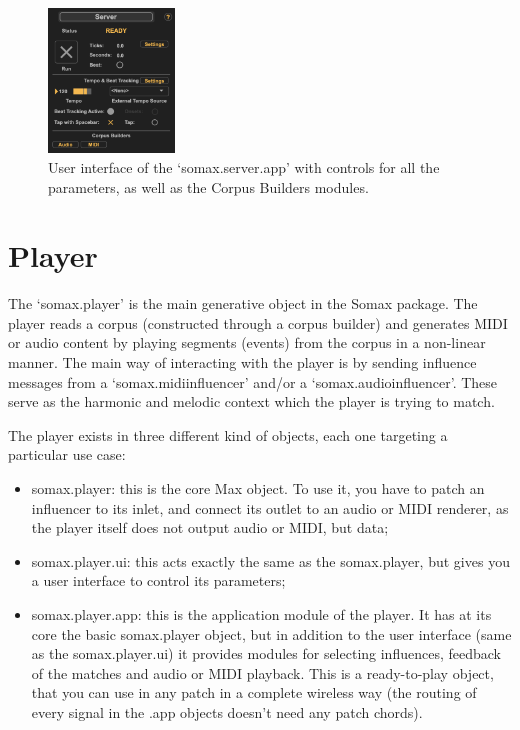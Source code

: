  \begin{figure}[H]
    \centering        
 	\includegraphics[width=0.3\textwidth, keepaspectratio]{img/server_app.png}
    \caption{User interface of the `somax.server.app' with controls for all the parameters, as well as the Corpus Builders modules.}
    \label{fig:server_app}
\end{figure}

\section{Player}

The `somax.player' is the main generative object in the Somax package. The player reads a corpus (constructed through a corpus builder) and generates MIDI or audio content by playing segments (events) from the corpus in a non-linear manner. The main way of interacting with the player is by sending influence messages from a `somax.midiinfluencer' and/or a `somax.audioinfluencer'. These serve as the harmonic and melodic context which the player is trying to match. 

The player exists in three different kind of objects, each one targeting a particular use case:

\begin{itemize}
    \item somax.player: this is the core Max object. To use it, you have to patch an influencer to its inlet, and connect its outlet to an audio or MIDI renderer, as the player itself does not output audio or MIDI, but data;
    \item somax.player.ui: this acts exactly the same as the somax.player, but gives you a user interface to control its parameters;
    \item somax.player.app: this is the application module of the player. It has at its core the basic somax.player object, but in addition to the user interface (same as the somax.player.ui) it provides modules for selecting influences, feedback of the matches and audio or MIDI playback. This is a ready-to-play object, that you can use in any patch in a complete wireless way (the routing of every signal in the .app objects doesn't need any patch chords).
\end{itemize}


